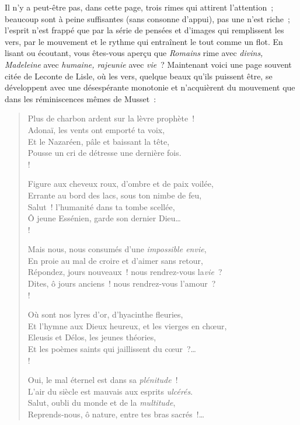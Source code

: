 \documentclass[french,twoside]{book} %
\begin{document}
\noindent Il n’y a peut-être pas, dans cette page, trois rimes qui attirent l’attention ; beaucoup sont à peine suffisantes (sans consonne d’appui), pas une n’est riche ; l’esprit n’est frappé que par la série de pensées et d’images qui remplissent les vers, par le mouvement et le rythme qui entraînent le tout comme un flot. En lisant ou écoutant, vous êtes-vous aperçu que \emph{Romains} rime avec \emph{divins, Madeleine} avec \emph{humaine, rajeunie} avec \emph{vie} ? Maintenant voici une page souvent citée de Leconte de Lisle, où les vers, quelque beaux qu’ils puissent être, se développent avec une désespérante monotonie et n’acquièrent du mouvement que dans les réminiscences mêmes de Musset :\par


\begin{verse}
Plus de charbon ardent sur la lèvre prophète ! \\
Adonaï, les vents ont emporté ta voix,\\
Et le Nazaréen, pâle et baissant la tête, \\
Pousse un cri de détresse une dernière fois.\\!

Figure aux cheveux roux, d’ombre et de paix voilée,\\
Errante au bord des lacs, sous ton nimbe de feu,\\
Salut ! l’humanité dans ta tombe scellée,\\
Ô jeune Essénien, garde son dernier Dieu…\\!

Mais nous, nous consumés d’une \emph{impossible envie},\\
En proie au mal de croire et d’aimer sans retour,\\
Répondez, jours nouveaux ! nous rendrez-vous la\emph{vie} ?\\
Dites, ô jours anciens ! nous rendrez-vous l’amour ?\\!

Où sont nos lyres d’or, d’hyacinthe fleuries,\\
Et l’hymne aux Dieux heureux, et les vierges en chœur,\\
Eleusis et Délos, les jeunes théories,\\
Et les poèmes saints qui jaillissent du cœur ?…\\!

Oui, le mal éternel est dans sa \emph{plénitude} !\\
L’air du siècle est mauvais aux esprits \emph{ulcérés}.\\
Salut, oubli du monde et de la \emph{multitude},\\
Reprends-nous, ô nature, entre tes bras sacrés !…\\
\end{verse}
\end{document}
